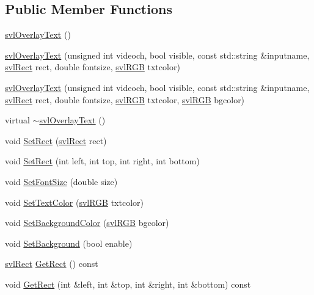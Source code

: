 \subsection*{Public Member Functions}
\begin{DoxyCompactItemize}
\item 
\hyperlink{classsvl_overlay_text_ae1327a383869cc21cf487319a3174431}{svl\+Overlay\+Text} ()
\item 
\hyperlink{classsvl_overlay_text_a938fd213b6579b8137c90ab8b51cdd0a}{svl\+Overlay\+Text} (unsigned int videoch, bool visible, const std\+::string \&inputname, \hyperlink{structsvl_rect}{svl\+Rect} rect, double fontsize, \hyperlink{structsvl_r_g_b}{svl\+R\+G\+B} txtcolor)
\item 
\hyperlink{classsvl_overlay_text_a1a41ff608dff4576246038f1369d33a9}{svl\+Overlay\+Text} (unsigned int videoch, bool visible, const std\+::string \&inputname, \hyperlink{structsvl_rect}{svl\+Rect} rect, double fontsize, \hyperlink{structsvl_r_g_b}{svl\+R\+G\+B} txtcolor, \hyperlink{structsvl_r_g_b}{svl\+R\+G\+B} bgcolor)
\item 
virtual \hyperlink{classsvl_overlay_text_acd6eea3c134bfa6a46454fcee10988a0}{$\sim$svl\+Overlay\+Text} ()
\item 
void \hyperlink{classsvl_overlay_text_a17d55a3f560cc4359d6068aca082e3cc}{Set\+Rect} (\hyperlink{structsvl_rect}{svl\+Rect} rect)
\item 
void \hyperlink{classsvl_overlay_text_a8bbed7dbfd22e6265fae8c08aec59715}{Set\+Rect} (int left, int top, int right, int bottom)
\item 
void \hyperlink{classsvl_overlay_text_a0835489891507d3ee13122341c96cfcc}{Set\+Font\+Size} (double size)
\item 
void \hyperlink{classsvl_overlay_text_a127f13097d41aed69bf9166bc5d86ca5}{Set\+Text\+Color} (\hyperlink{structsvl_r_g_b}{svl\+R\+G\+B} txtcolor)
\item 
void \hyperlink{classsvl_overlay_text_a21954c0fd5e72f2f7699b95de9a8168d}{Set\+Background\+Color} (\hyperlink{structsvl_r_g_b}{svl\+R\+G\+B} bgcolor)
\item 
void \hyperlink{classsvl_overlay_text_aa50bd14abb4c29f74dcac72674a03f6c}{Set\+Background} (bool enable)
\item 
\hyperlink{structsvl_rect}{svl\+Rect} \hyperlink{classsvl_overlay_text_a7ae544b4a8dd4f1f39dce71d14f3fc9a}{Get\+Rect} () const 
\item 
void \hyperlink{classsvl_overlay_text_a026ac52a3b59318448011a6a2a90c8a1}{Get\+Rect} (int \&left, int \&top, int \&right, int \&bottom) const 

\end{DoxyCompactItemize}
